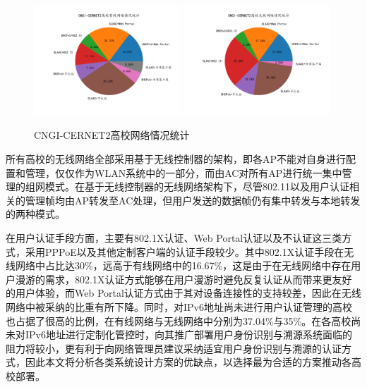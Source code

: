   \begin{figure}[ht]
    \centering
    {\includegraphics[width=0.49\textwidth]{figures/CNGI_CERNET2_wired.png}}
    {\includegraphics[width=0.49\textwidth]{figures/CNGI_CERNET2_wireless.png}}
    \caption{CNGI-CERNET2高校网络情况统计}
    \label{fig:CNGI_CERNET2_statistic}
  \end{figure}
  
  所有高校的无线网络全部采用基于无线控制器的架构，即各AP不能对自身进行配置和管理，仅仅作为WLAN系统中的一部分，而由AC对所有AP进行统一集中管理的组网模式。在基于无线控制器的无线网络架构下，尽管802.11以及用户认证相关的管理帧均由AP转发至AC处理，但用户发送的数据帧仍有集中转发与本地转发的两种模式。
  
  在用户认证手段方面，主要有802.1X认证、Web Portal认证以及不认证这三类方式，采用PPPoE以及其他定制客户端的认证手段较少。其中802.1X认证手段在无线网络中占比达30\%，远高于有线网络中的16.67\%，这是由于在无线网络中存在用户漫游的需求，802.1X认证方式能够在用户漫游时避免反复认证从而带来更友好的用户体验，而Web Portal认证方式由于其对设备连接性的支持较差，因此在无线网络中被采纳的比重有所下降。同时，对IPv6地址尚未进行用户认证管理的高校也占据了很高的比例，在有线网络与无线网络中分别为37.04\%与35\%。在各高校尚未对IPv6地址进行定制化管控时，向其推广部署用户身份识别与溯源系统面临的阻力将较小，更有利于向网络管理员建议采纳适宜用户身份识别与溯源的认证方式，因此本文将分析各类系统设计方案的优缺点，以选择最为合适的方案推动各高校部署。
  
